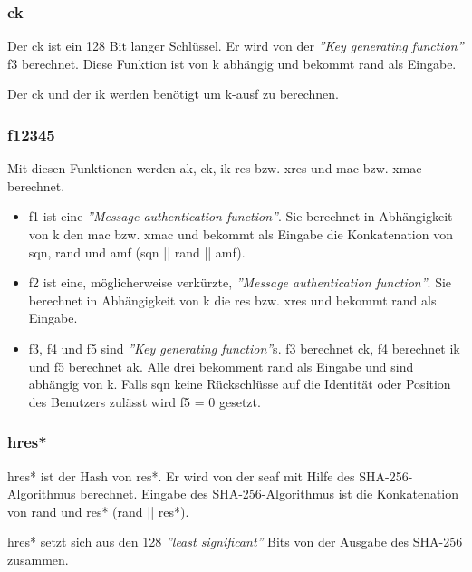 \subsubsection{\gls{ck}}
Der \gls{ck} ist ein 128 Bit langer Schl\"ussel. %
Er wird von der \textit{''Key generating function''} f3 berechnet.
Diese Funktion ist von \gls{k} abh\"angig und bekommt \gls{rand} als Eingabe. %

Der \gls{ck} und der \gls{ik} werden ben\"otigt um \gls{k-ausf} zu berechnen.

\subsubsection{\gls{f12345}}
Mit diesen Funktionen werden \gls{ak}, \gls{ck}, \gls{ik} \gls{res} bzw. \gls{xres} und \gls{mac} bzw. \gls{xmac} berechnet. %
\begin{itemize}
\item f1 ist eine \textit{''Message authentication function''}.
Sie berechnet in Abh\"angigkeit von \gls{k} den \gls{mac} bzw. \gls{xmac} und bekommt als Eingabe die Konkatenation von \gls{sqn}, \gls{rand} und \gls{amf} (\gls{sqn} || \gls{rand} || \gls{amf}). \\
\item f2 ist eine, m\"oglicherweise verk\"urzte, \textit{''Message authentication function''}.
Sie berechnet in Abh\"angigkeit von \gls{k} die \gls{res} bzw. \gls{xres} und bekommt \gls{rand} als Eingabe.
\item f3, f4 und f5 sind \textit{''Key generating function''}s.
f3 berechnet \gls{ck}, f4 berechnet \gls{ik} und f5 berechnet \gls{ak}.
Alle drei bekomment \gls{rand} als Eingabe und sind abh\"angig von \gls{k}.
Falls \gls{sqn} keine R\"uckschl\"usse auf die Identit\"at oder Position des Benutzers zul\"asst wird f5 = 0 gesetzt.
\end{itemize}

\subsubsection{\gls{hres*}}
\gls{hres*} ist der Hash von \gls{res*}.
Er wird von der \gls{seaf} mit Hilfe des SHA-256-Algorithmus berechnet. %
Eingabe des SHA-256-Algorithmus ist die Konkatenation von \gls{rand} und \gls{res*} (\gls{rand} || \gls{res*}).

\gls{hres*} setzt sich aus den 128 \textit{''least significant''} Bits von der Ausgabe des SHA-256 zusammen.

